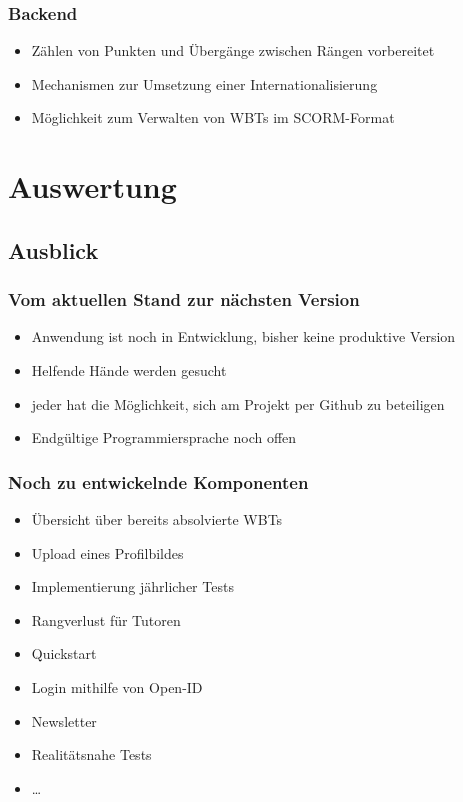 \documentclass[xcolor=dvipsnames, utf8]{beamer}
\begin{document}
\begin{frame}
  \frametitle{Backend}
  \begin{itemize}
  \item Zählen von Punkten und Übergänge zwischen Rängen vorbereitet
  \item Mechanismen zur Umsetzung einer Internationalisierung
  \item Möglichkeit zum Verwalten von WBTs im SCORM-Format  
\end{itemize}
\end{frame}

\section{Auswertung}
\subsection{Ausblick}
\begin{frame}
\frametitle{Vom aktuellen Stand zur nächsten Version}
\begin{itemize}
  \item Anwendung ist noch in Entwicklung, bisher keine produktive Version
  \item Helfende Hände werden gesucht
  \item jeder hat die Möglichkeit, sich am Projekt per Github zu beteiligen
  \item Endgültige Programmiersprache noch offen
\end{itemize}
\end{frame}

\begin{frame}
\frametitle{Noch zu entwickelnde Komponenten}
\begin{itemize}
  \item Übersicht über bereits absolvierte WBTs
  \item Upload eines Profilbildes
  \item Implementierung jährlicher Tests
  \item Rangverlust für Tutoren
  \item Quickstart
  \item Login mithilfe von Open-ID
  \item Newsletter
  \item Realitätsnahe Tests
  \item \ldots
\end{itemize}
\end{frame}
\end{document}
